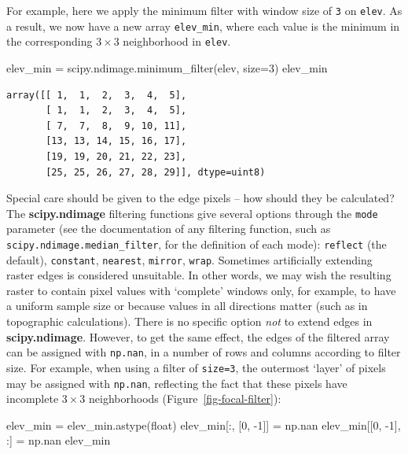 \documentclass[
  letterpaper,
]{krantz}
\newenvironment{Shaded}{\begin{snugshade}}{\end{snugshade}}
\newcommand{\BuiltInTok}[1]{\textcolor[rgb]{0.00,0.23,0.31}{#1}}
\newcommand{\DecValTok}[1]{\textcolor[rgb]{0.68,0.00,0.00}{#1}}
\newcommand{\NormalTok}[1]{\textcolor[rgb]{0.00,0.23,0.31}{#1}}
\newcommand{\OperatorTok}[1]{\textcolor[rgb]{0.37,0.37,0.37}{#1}}
\begin{document}
For example, here we apply the minimum filter with window size of
\texttt{3} on \texttt{elev}. As a result, we now have a new array
\texttt{elev\_min}, where each value is the minimum in the corresponding
\(3 \times 3\) neighborhood in \texttt{elev}.

\begin{Shaded}
\begin{Highlighting}[]
\NormalTok{elev\_min }\OperatorTok{=}\NormalTok{ scipy.ndimage.minimum\_filter(elev, size}\OperatorTok{=}\DecValTok{3}\NormalTok{)}
\NormalTok{elev\_min}
\end{Highlighting}
\end{Shaded}

\begin{verbatim}
array([[ 1,  1,  2,  3,  4,  5],
       [ 1,  1,  2,  3,  4,  5],
       [ 7,  7,  8,  9, 10, 11],
       [13, 13, 14, 15, 16, 17],
       [19, 19, 20, 21, 22, 23],
       [25, 25, 26, 27, 28, 29]], dtype=uint8)
\end{verbatim}

Special care should be given to the edge pixels -- how should they be
calculated? The \textbf{scipy.ndimage} filtering functions give several
options through the \texttt{mode} parameter (see the documentation of
any filtering function, such as \texttt{scipy.ndimage.median\_filter},
for the definition of each mode): \texttt{reflect} (the default),
\texttt{constant}, \texttt{nearest}, \texttt{mirror}, \texttt{wrap}.
Sometimes artificially extending raster edges is considered unsuitable.
In other words, we may wish the resulting raster to contain pixel values
with `complete' windows only, for example, to have a uniform sample size
or because values in all directions matter (such as in topographic
calculations). There is no specific option \emph{not} to extend edges in
\textbf{scipy.ndimage}. However, to get the same effect, the edges of
the filtered array can be assigned with \texttt{np.nan}, in a number of
rows and columns according to filter size. For example, when using a
filter of \texttt{size=3}, the outermost `layer' of pixels may be
assigned with \texttt{np.nan}, reflecting the fact that these pixels
have incomplete \(3 \times 3\) neighborhoods
(Figure~\ref{fig-focal-filter}):

\begin{Shaded}
\begin{Highlighting}[]
\NormalTok{elev\_min }\OperatorTok{=}\NormalTok{ elev\_min.astype(}\BuiltInTok{float}\NormalTok{)}
\NormalTok{elev\_min[:, [}\DecValTok{0}\NormalTok{, }\OperatorTok{{-}}\DecValTok{1}\NormalTok{]] }\OperatorTok{=}\NormalTok{ np.nan}
\NormalTok{elev\_min[[}\DecValTok{0}\NormalTok{, }\OperatorTok{{-}}\DecValTok{1}\NormalTok{], :] }\OperatorTok{=}\NormalTok{ np.nan}
\NormalTok{elev\_min}
\end{Highlighting}
\end{Shaded}
\end{document}
